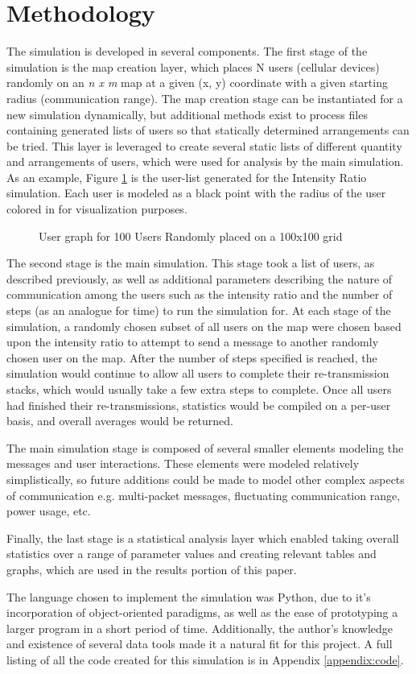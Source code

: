 \section{Methodology}
The simulation is developed in several components.
The first stage of the simulation is the map creation layer,
which places N users (cellular devices) randomly on an \textit{n x m} map at a
given (x, y) coordinate with a given starting radius (communication range).
The map creation stage can be instantiated for a new simulation dynamically, 
but additional methods exist to process files containing generated lists of 
users so that statically determined arrangements can be tried.
This layer is leveraged to create several static lists of different quantity
and arrangements of users, which were used for analysis by the main simulation.
As an example, Figure \ref{fig:usergraph} is the user-list
generated for the Intensity Ratio simulation.
Each user is modeled as a black point with the radius of the user colored in
for visualization purposes.
\par
\begin{figure}
    
    \caption{User graph for 100 Users Randomly placed on a 100x100 grid}
    \label{fig:usergraph}
\end{figure}
\par

The second stage is the main simulation.
This stage took a list of users, as described previously, as well as additional
parameters describing the nature of communication among the users such as
the intensity ratio and the number of steps (as an analogue for time) to run 
the simulation for.
At each stage of the simulation, a randomly chosen subset of all users on the map
were chosen based upon the intensity ratio to attempt to send a message to another
randomly chosen user on the map.
After the number of steps specified is reached, the simulation would continue
to allow all users to complete their re-transmission stacks, which would usually
take a few extra steps to complete.
Once all users had finished their re-transmissions, statistics would be compiled
on a per-user basis, and overall averages would be returned.

The main simulation stage is composed of several smaller elements modeling
the messages and user interactions.
These elements were modeled relatively simplistically, so future additions could be
made to model other complex aspects of communication e.g. multi-packet messages,
fluctuating communication range, power usage, etc.

Finally, the last stage is a statistical analysis layer which enabled taking overall
statistics over a range of parameter values and creating relevant tables and graphs,
which are used in the results portion of this paper.

The language chosen to implement the simulation was Python, due to it's incorporation of 
object-oriented paradigms, as well as the ease of prototyping a larger program in a 
short period of time.
Additionally, the author's knowledge and existence of several data tools made it a natural
fit for this project.
A full listing of all the code created for this simulation is in Appendix \ref{appendix:code}.

